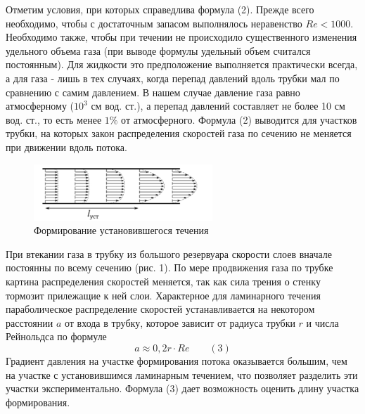 \documentclass[a4paper, 12pt]{article}%
\begin{document}
Отметим условия, при которых справедлива формула (2). Прежде всего необходимо, чтобы с достаточным запасом выполнялось неравенство $Re < 1000$. Необходимо также, чтобы при течении не происходило существенного изменения удельного объема газа (при выводе формулы удельный объем считался постоянным). Для жидкости это предположение выполняется практически всегда, а для газа - лишь в тех случаях, когда перепад давлений вдоль трубки мал по сравнению с самим давлением. В нашем случае давление газа равно атмосферному ($10^3$ см вод. ст.), а перепад давлений составляет не более 10 см вод. ст., то есть менее $1\%$ от атмосферного. Формула (2) выводится для участков трубки, на которых закон распределения скоростей газа по сечению не меняется при движении вдоль потока.
\begin{figure}
  \begin{center}
    \includegraphics[width = 0.6\textwidth]{fig1.jpg}
    \caption{Формирование установившегося течения}
  \end{center}
\end{figure}
При втекании газа в трубку из большого резервуара скорости слоев вначале постоянны по всему сечению (рис. 1). По мере продвижения газа по трубке картина распределения скоростей меняется, так как сила трения о стенку тормозит прилежащие к ней слои. Характерное для ламинарного течения параболическое распределение скоростей устанавливается на некотором расстоянии $a$ от входа в трубку, которое зависит от радиуса трубки $r$ и числа Рейнольдса по формуле
\[a \approx  0,2 r \cdot Re \text{ } \text{ } \text{ } (3)\]
Градиент давления на участке формирования потока оказывается большим, чем на участке с установившимся ламинарным течением, что позволяет разделить эти участки экспериментально. Формула (3) дает возможность оценить длину участка формирования.
\end{document}
